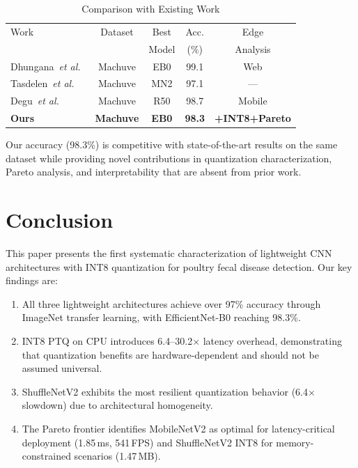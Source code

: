 \documentclass[conference,a4paper]{IEEEtran}
\begin{document}
\begin{table}[htbp]
\caption{Comparison with Existing Work}
\label{tab:comparison}
\centering
\begin{tabular}{lcccc}
\toprule
Work & Dataset & Best & Acc. & Edge \\
 & & Model & (\%) & Analysis \\
\midrule
Dhungana~\textit{et al.}~\cite{dhungana2025} & Machuve & EB0 & 99.1 & Web \\
Tasdelen~\textit{et al.}~\cite{tasdelen2025} & Machuve & MN2 & 97.1 & --- \\
Degu~\textit{et al.}~\cite{degu2023} & Machuve & R50 & 98.7 & Mobile \\
\textbf{Ours} & \textbf{Machuve} & \textbf{EB0} & \textbf{98.3} & \textbf{+INT8+Pareto} \\
\bottomrule
\end{tabular}
\end{table}

Our accuracy (98.3\%) is competitive with state-of-the-art results on the same dataset while providing novel contributions in quantization characterization, Pareto analysis, and interpretability that are absent from prior work.

\section{Conclusion}

This paper presents the first systematic characterization of lightweight CNN architectures with INT8 quantization for poultry fecal disease detection. Our key findings are:

\begin{enumerate}
    \item All three lightweight architectures achieve over 97\% accuracy through ImageNet transfer learning, with EfficientNet-B0 reaching 98.3\%.
    \item INT8 PTQ on CPU introduces 6.4--30.2$\times$ latency overhead, demonstrating that quantization benefits are hardware-dependent and should not be assumed universal.
    \item ShuffleNetV2 exhibits the most resilient quantization behavior (6.4$\times$ slowdown) due to architectural homogeneity.
    \item The Pareto frontier identifies MobileNetV2 as optimal for latency-critical deployment (1.85\,ms, 541\,FPS) and ShuffleNetV2 INT8 for memory-constrained scenarios (1.47\,MB).
\end{enumerate}
\end{document}
